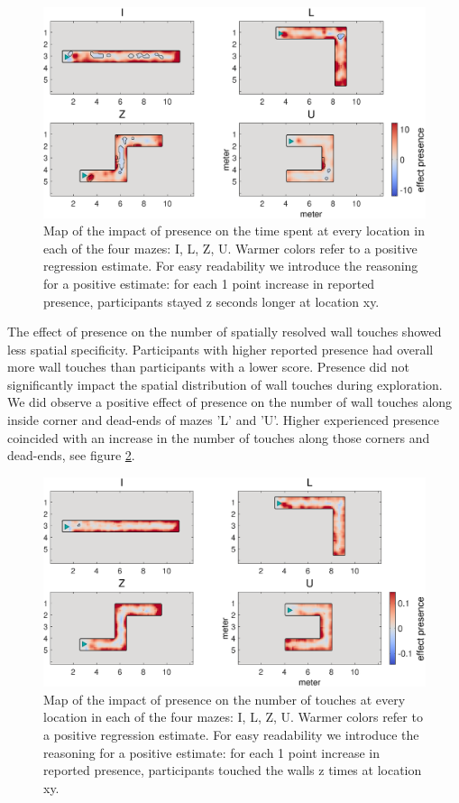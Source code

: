 \begin{figure}[h]
\centering
\includegraphics[width=\linewidth]{figures/effect_presence_duration.eps}
\vspace{0pt}
\caption{Map of the impact of presence on the time spent at every location in each of the four mazes: I, L, Z, U. Warmer colors refer to a positive regression estimate. For easy readability we introduce the reasoning for a positive estimate: for each 1 point increase in reported presence, participants stayed z seconds longer at location xy.}
\label{results_dur_effect}
\end{figure}

The effect of presence on the number of spatially resolved wall touches showed less spatial specificity. Participants with higher reported presence had overall more wall touches than participants with a lower score. Presence did not significantly impact the spatial distribution of wall touches during exploration. We did observe a positive effect of presence on the number of wall touches along inside corner and dead-ends of mazes 'L' and 'U'. Higher experienced presence coincided with an increase in the number of touches along those corners and dead-ends, see figure \ref{results_touches_effect}.

\begin{figure}[h]
\centering
\includegraphics[width=\linewidth]{figures/effect_presence_wall_touches.eps}
\vspace{0pt}
\caption{{Map of the impact of presence on the number of touches at every location in each of the four mazes: I, L, Z, U. Warmer colors refer to a positive regression estimate. For easy readability we introduce the reasoning for a positive estimate: for each 1 point increase in reported presence, participants touched the walls z times at location xy.}}
\label{results_touches_effect}
\end{figure}